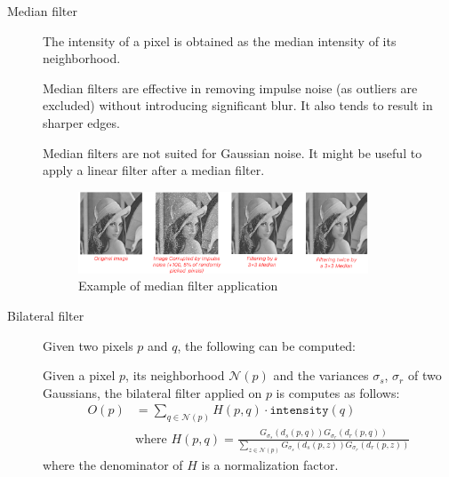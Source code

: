 \begin{description}
    \item[Median filter] 
        The intensity of a pixel is obtained as the median intensity of its neighborhood.

        \begin{remark}
            Median filters are effective in removing impulse noise (as outliers are excluded) without introducing significant blur.
            It also tends to result in sharper edges.
        \end{remark}

        \begin{remark}
            Median filters are not suited for Gaussian noise.
            It might be useful to apply a linear filter after a median filter.
        \end{remark}

        \begin{figure}[H]
            \centering
            \includegraphics[width=0.85\textwidth]{./img/_median_filter_example.pdf}
            \caption{Example of median filter application}
        \end{figure}


    \item[Bilateral filter] 
        Given two pixels $p$ and $q$, the following can be computed:

        Given a pixel $p$, its neighborhood $\mathcal{N}(p)$ and the variances $\sigma_s$, $\sigma_r$ of two Gaussians,
        the bilateral filter applied on $p$ is computes as follows:
        \[ 
            \begin{split}
                O(p) &= \sum_{q \in \mathcal{N}(p)} H(p, q) \cdot \texttt{intensity}(q) \\
                &\text{where } H(p, q) = \frac{G_{\sigma_s}(d_s(p, q)) G_{\sigma_r}(d_r(p, q))}{\sum_{z \in \mathcal{N}(p)} G_{\sigma_s}(d_s(p, z)) G_{\sigma_r}(d_r(p, z))}
            \end{split}    
        \]
        where the denominator of $H$ is a normalization factor.


\end{description}
